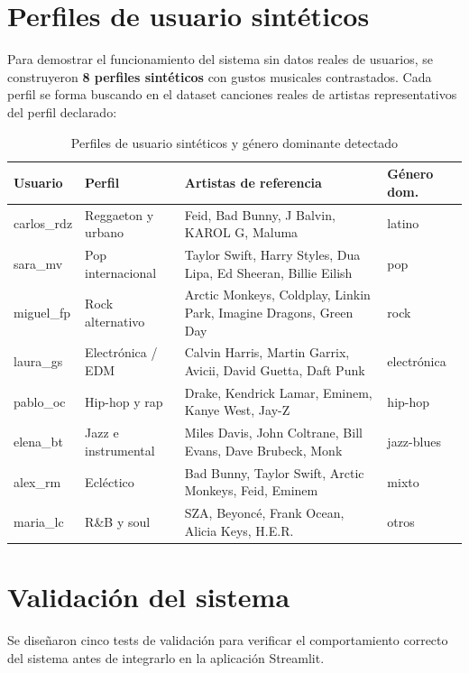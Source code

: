 \documentclass[12pt, a4paper]{book}
\theoremstyle{definition}
\begin{document}
\section{Perfiles de usuario sintéticos}
\label{sec:usuarios_sinteticos}

Para demostrar el funcionamiento del sistema sin datos reales de usuarios,
se construyeron \textbf{8 perfiles sintéticos} con gustos musicales
contrastados. Cada perfil se forma buscando en el dataset canciones reales
de artistas representativos del perfil declarado:

\begin{table}[H]
\centering
\caption{Perfiles de usuario sintéticos y género dominante detectado}
\label{tab:usuarios}
\small
\begin{tabular}{llp{5.5cm}l}
\toprule
\textbf{Usuario} & \textbf{Perfil} & \textbf{Artistas de referencia} & \textbf{Género dom.} \\
\midrule
carlos\_rdz & Reggaeton y urbano &
  Feid, Bad Bunny, J Balvin, KAROL G, Maluma & latino \\
sara\_mv & Pop internacional &
  Taylor Swift, Harry Styles, Dua Lipa, Ed Sheeran, Billie Eilish & pop \\
miguel\_fp & Rock alternativo &
  Arctic Monkeys, Coldplay, Linkin Park, Imagine Dragons, Green Day & rock \\
laura\_gs & Electrónica / EDM &
  Calvin Harris, Martin Garrix, Avicii, David Guetta, Daft Punk & electrónica \\
pablo\_oc & Hip-hop y rap &
  Drake, Kendrick Lamar, Eminem, Kanye West, Jay-Z & hip-hop \\
elena\_bt & Jazz e instrumental &
  Miles Davis, John Coltrane, Bill Evans, Dave Brubeck, Monk & jazz-blues \\
alex\_rm & Ecléctico &
  Bad Bunny, Taylor Swift, Arctic Monkeys, Feid, Eminem & mixto \\
maria\_lc & R\&B y soul &
  SZA, Beyoncé, Frank Ocean, Alicia Keys, H.E.R. & otros \\
\bottomrule
\end{tabular}
\end{table}

\section{Validación del sistema}
\label{sec:validacion}

Se diseñaron cinco tests de validación para verificar el comportamiento
correcto del sistema antes de integrarlo en la aplicación Streamlit.
\end{document}
